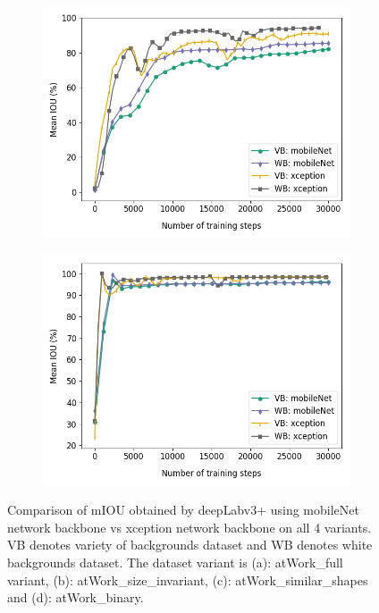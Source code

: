 \begin{figure}
\begin{subfigure}{.5\textwidth}
			\includegraphics[width=1\linewidth]{images/mobxcep_shape}
			\label{4varsc}
			\caption{}
		\end{subfigure}
		\begin{subfigure}{.5\textwidth}
			\centering
			\includegraphics[width=1\linewidth]{images/mobxcep_binary}
			\label{4varsd}
			\caption{}
		\end{subfigure}
		\caption{Comparison of mIOU obtained by deepLabv3+ using mobileNet network backbone vs xception network backbone on all 4 variants. VB denotes variety of backgrounds dataset and WB denotes white backgrounds dataset. The dataset variant is (a): atWork\_full variant, (b): atWork\_size\_invariant, (c): atWork\_similar\_shapes and (d): atWork\_binary.}
		\label{Fig:4vars}
	\end{figure}

